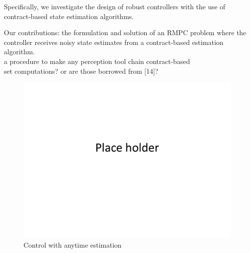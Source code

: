 Specifically, we investigate the design of robust controllers with the use of contract-based state estimation algorithms.

Our contributions: 
the formulation and solution of an RMPC problem where the controller receives noisy state estimates from a contract-based estimation algorithm.
\\
a procedure to make any perception tool chain contract-based 
\\
set computations? or are those borrowed from [14]?


\begin{figure}[t]
	\centering
	\includegraphics[width=0.7\linewidth]{figures/placeHolder}
	\caption{Control with anytime estimation}
	\label{fig:feedbackloop}
\end{figure}